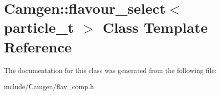 \hypertarget{a00233}{}\section{Camgen\+:\+:flavour\+\_\+select$<$ particle\+\_\+t $>$ Class Template Reference}
\label{a00233}


The documentation for this class was generated from the following file\+:\begin{DoxyCompactItemize}
\item 
include/\+Camgen/flav\+\_\+comp.\+h\end{DoxyCompactItemize}
